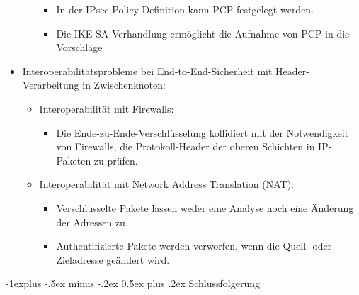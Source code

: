\documentclass[a4paper]{article}
\makeatletter
\renewcommand{\subsection}{\@startsection{subsection}{2}{0mm}%
 {-1explus -.5ex minus -.2ex}%
 {0.5ex plus .2ex}%
 {\normalfont\normalsize\bfseries}}
\makeatother
\begin{document}
\begin{multicols}{3}
\begin{itemize}
\begin{itemize}
                        \begin{itemize}
                            \item
                                  In der IPsec-Policy-Definition kann PCP festgelegt werden.
                            \item
                                  Die IKE SA-Verhandlung ermöglicht die Aufnahme von PCP in die
                                  Vorschläge
                        \end{itemize}
              \end{itemize}
        \item
              Interoperabilitätsprobleme bei End-to-End-Sicherheit mit
              Header-Verarbeitung in Zwischenknoten:

              \begin{itemize}
                  \item
                        Interoperabilität mit Firewalls:

                        \begin{itemize}
                            \item
                                  Die Ende-zu-Ende-Verschlüsselung kollidiert mit der Notwendigkeit
                                  von Firewalls, die Protokoll-Header der oberen Schichten in
                                  IP-Paketen zu prüfen.
                        \end{itemize}
                  \item
                        Interoperabilität mit Network Address Translation (NAT):

                        \begin{itemize}
                            \item
                                  Verschlüsselte Pakete lassen weder eine Analyse noch eine Änderung
                                  der Adressen zu.
                            \item
                                  Authentifizierte Pakete werden verworfen, wenn die Quell- oder
                                  Zieladresse geändert wird.
                        \end{itemize}
              \end{itemize}
    \end{itemize}


    \subsection{Schlussfolgerung}


\end{multicols}
\end{document}

